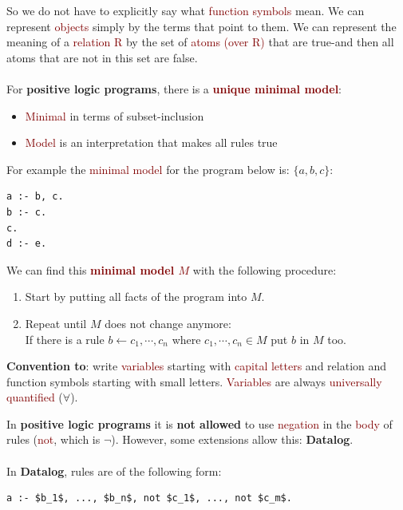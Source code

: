So we do not have to explicitly say what \textcolor{Maroon}{function symbols} mean. We can represent \textcolor{Maroon}{objects} simply by the terms that point to them. We can represent the meaning of a \textcolor{Maroon}{relation R} by the set of \textcolor{Maroon}{atoms (over R)} that are true-and then all atoms that are not in this set are false. \\
\\
For \textbf{positive logic programs}, there is a \textbf{\textcolor{Maroon}{unique minimal model}}:
\begin{itemize}
    \item \textcolor{Maroon}{Minimal} in terms of subset-inclusion
    \item \textcolor{Maroon}{Model} is an interpretation that makes all rules true
\end{itemize}

For example the \textcolor{Maroon}{minimal model} for the program below is: $\{a, b, c\}$:
\begin{lstlisting}
a :- b, c.
b :- c.
c.
d :- e.
\end{lstlisting}

We can find this \textbf{\textcolor{Maroon}{minimal model $M$}} with the following procedure:
\begin{enumerate}
    \setlength\itemsep{0em}
    \item Start by putting all facts of the program into $M$.
    \item Repeat until $M$ does not change anymore:\\
    If there is a rule $b \leftarrow c_1,\cdots,c_n$ where $c_1,\cdots,c_n \in M$ put $b$ in $M$ too.
\end{enumerate}

\textbf{Convention to}: write \textcolor{Maroon}{variables} starting with \textcolor{Maroon}{capital letters} and \textcolor{NavyBlue}{relation} and \textcolor{NavyBlue}{function symbols} starting with \textcolor{NavyBlue}{small letters}. \textcolor{Maroon}{Variables} are always \textcolor{Maroon}{universally quantified} ($\forall$).
\newpage

In \textbf{positive logic programs} it is \textbf{not allowed} to use \textcolor{Maroon}{negation} in the \textcolor{Maroon}{body} of rules (\textcolor{Maroon}{not}, which is $\neg$). However, some \textcolor{PineGreen}{extensions} allow this: \textbf{\textcolor{PineGreen}{Datalog}}.\\
\\
In \textbf{\textcolor{PineGreen}{Datalog}}, rules are of the following form:
\begin{lstlisting}
a :- $b_1$, ..., $b_n$, not $c_1$, ..., not $c_m$.
\end{lstlisting}

